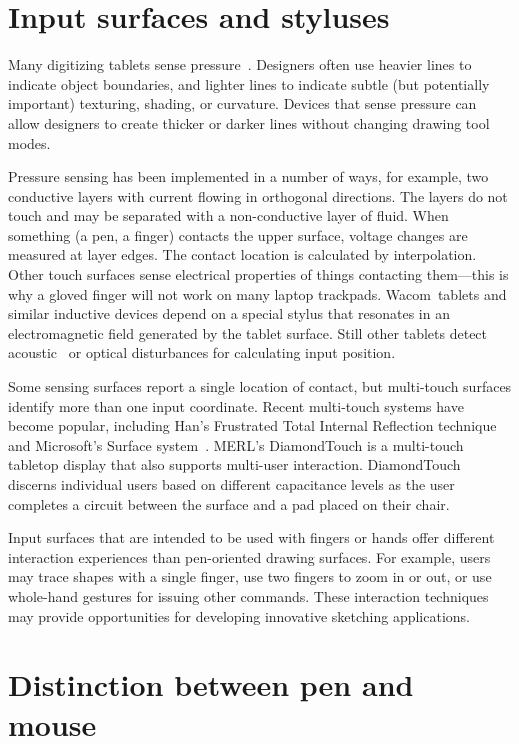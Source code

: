 \section{Input surfaces and styluses}
\label{sec:multi-sense}

Many digitizing tablets sense
pressure~\cite{meyer-pen-review}. Designers often use heavier lines to
indicate object boundaries, and lighter lines to indicate subtle (but
potentially important) texturing, shading, or curvature. Devices that
sense pressure can allow designers to create thicker or darker lines
without changing drawing tool modes.

Pressure sensing has been implemented in a number of ways, for
example, two conductive layers with current flowing in orthogonal
directions. The layers do not touch and may be separated with a
non-conductive layer of fluid. When something (a pen, a finger)
contacts the upper surface, voltage changes are measured at layer
edges. The contact location is calculated by interpolation. Other
touch surfaces sense electrical properties of things contacting
them---this is why a gloved finger will not work on many laptop
trackpads. Wacom\texttrademark\ tablets and similar inductive devices
depend on a special stylus that resonates in an electromagnetic field
generated by the tablet surface. Still other tablets detect
acoustic~\cite{debruyne-acoustic} or optical disturbances for
calculating input position.

Some sensing surfaces report a single location of contact, but
multi-touch surfaces identify more than one input coordinate. Recent
multi-touch systems have become popular, including Han's Frustrated
Total Internal Reflection technique~\cite{han-multitouch} and
Microsoft's Surface system~\cite{microsoft-surface}. MERL's
DiamondTouch is a multi-touch tabletop display that also supports
multi-user interaction. DiamondTouch discerns individual users based
on different capacitance levels as the user completes a circuit
between the surface and a pad placed on their chair. 

Input surfaces that are intended to be used with fingers or hands
offer different interaction experiences than pen-oriented drawing
surfaces. For example, users may trace shapes with a single finger,
use two fingers to zoom in or out, or use whole-hand gestures for
issuing other commands. These interaction techniques may provide
opportunities for developing innovative sketching applications.

\section{Distinction between pen and mouse}
\label{sec:computation-pen-vs-mouse}

